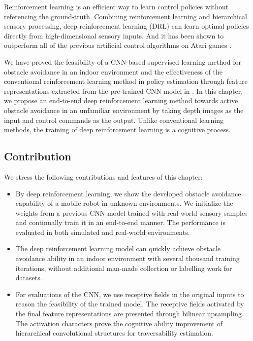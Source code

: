 Reinforcement learning is an efficient way to learn control policies without referencing the ground-truth. Combining reinforcement learning and hierarchical sensory processing, deep reinforcement learning (DRL) \cite{mnih2015human} can learn optimal policies directly from high-dimensional sensory inputs. And it has been shown to outperform all of the previous artificial control algorithms on Atari games \cite{mnih2013playing}.


We have proved the feasibility of a CNN-based supervised learning method for obstacle avoidance in an indoor environment \cite{tai2016deep, tai2017autonomous} and the effectiveness of the conventional reinforcement learning method in policy estimation \cite{tai2016mobile, tl_rcar_2016} through feature representations extracted from the pre-trained CNN model in \cite{tai2016deep}. In this chapter, we propose an end-to-end deep reinforcement learning method towards active obstacle avoidance in an unfamiliar environment by taking depth images as the input and control commands as the output. Unlike conventional learning methods, the training of deep reinforcement learning is a cognitive process.

\subsection{Contribution}
\label{sec:ob_contributions}
We stress the following contributions and features of this chapter:

\begin{itemize}

\item
By deep reinforcement learning, we show the developed obstacle avoidance capability of a mobile robot in unknown environments. We initialize the weights from a previous CNN model trained with real-world sensory samples and continually train it in an end-to-end manner. The performance is evaluated in both simulated and real-world environments.

\item The deep reinforcement learning model can quickly achieve obstacle avoidance ability in an indoor environment with several thousand training iterations, without additional man-made collection or labelling work for datasets.

\item For evaluations of the CNN, we use receptive fields in the original inputs to reason the feasibility of the trained model. The receptive fields activated by the final feature representations are presented through bilinear upsampling. The activation characters prove the cognitive ability improvement of hierarchical convolutional structures for
traversability estimation.

\end{itemize}
